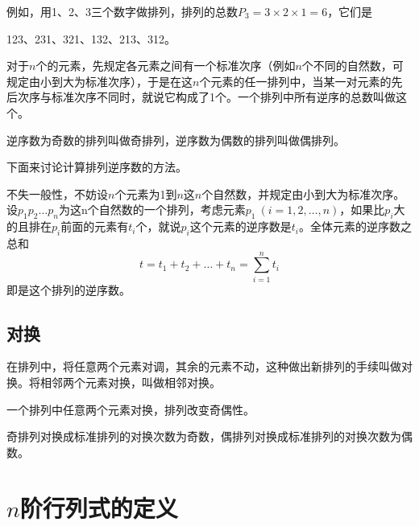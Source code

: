 例如，用1、2、3三个数字做排列，排列的总数$ P_{3} = 3 \times 2 \times 1 = 6 $，它们是
\begin{center}
	123、231、321、132、213、312。
\end{center}

\begin{定义}
	对于$ n $个的元素，先规定各元素之间有一个标准次序（例如$ n $个不同的自然数，可规定由小到大为标准次序），于是在这$ n $个元素的任一排列中，当某一对元素的先后次序与标准次序不同时，就说它构成了1个。一个排列中所有逆序的总数叫做这个。
\end{定义}

逆序数为奇数的排列叫做奇排列，逆序数为偶数的排列叫做偶排列。

下面来讨论计算排列逆序数的方法。

不失一般性，不妨设$ n $个元素为1到$ n $这$ n $个自然数，并规定由小到大为标准次序。设$ p_{1}p_{2}\dots p_{n} $为这n个自然数的一个排列，考虑元素$ p_{1}\ (i=1,2,\dots,n) $，如果比$ p_{i} $大的且排在$ p_{i} $前面的元素有$ t_{i} $个，就说$ p_{i} $这个元素的逆序数是$ t_{i} $。全体元素的逆序数之总和
\begin{equation}
t = t_{1} + t_{2} + \dots + t_{n} = \sum_{i=1}^{n}t_{i}
\end{equation}
即是这个排列的逆序数。

\subsection{对换}

在排列中，将任意两个元素对调，其余的元素不动，这种做出新排列的手续叫做对换。将相邻两个元素对换，叫做相邻对换。

\begin{定理}
	一个排列中任意两个元素对换，排列改变奇偶性。
\end{定理}

\begin{推论}
	奇排列对换成标准排列的对换次数为奇数，偶排列对换成标准排列的对换次数为偶数。
\end{推论}

\section{$ n $阶行列式的定义}

